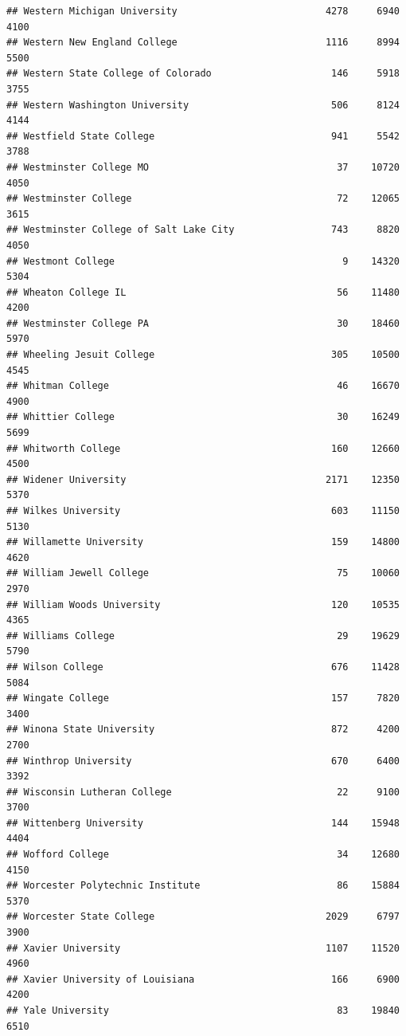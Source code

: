 \documentclass[
]{article}
\begin{document}
\begin{verbatim}
## Western Michigan University                          4278     6940       4100
## Western New England College                          1116     8994       5500
## Western State College of Colorado                     146     5918       3755
## Western Washington University                         506     8124       4144
## Westfield State College                               941     5542       3788
## Westminster College MO                                 37    10720       4050
## Westminster College                                    72    12065       3615
## Westminster College of Salt Lake City                 743     8820       4050
## Westmont College                                        9    14320       5304
## Wheaton College IL                                     56    11480       4200
## Westminster College PA                                 30    18460       5970
## Wheeling Jesuit College                               305    10500       4545
## Whitman College                                        46    16670       4900
## Whittier College                                       30    16249       5699
## Whitworth College                                     160    12660       4500
## Widener University                                   2171    12350       5370
## Wilkes University                                     603    11150       5130
## Willamette University                                 159    14800       4620
## William Jewell College                                 75    10060       2970
## William Woods University                              120    10535       4365
## Williams College                                       29    19629       5790
## Wilson College                                        676    11428       5084
## Wingate College                                       157     7820       3400
## Winona State University                               872     4200       2700
## Winthrop University                                   670     6400       3392
## Wisconsin Lutheran College                             22     9100       3700
## Wittenberg University                                 144    15948       4404
## Wofford College                                        34    12680       4150
## Worcester Polytechnic Institute                        86    15884       5370
## Worcester State College                              2029     6797       3900
## Xavier University                                    1107    11520       4960
## Xavier University of Louisiana                        166     6900       4200
## Yale University                                        83    19840       6510

\end{verbatim}
\end{document}
